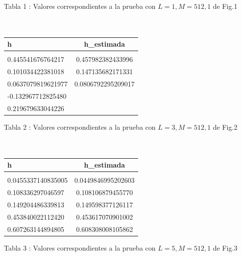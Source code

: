 \documentclass[10pt,journal,compsoc]{IEEEtran}
\begin{document}
Tabla 1 : Valores correspondientes a la prueba con $L=1 , M=512, 1$ de Fig.1 \\ \\ \\

\begin{tabular}{l c}
\hline\hline
h &  h\_estimada\\
\hline \\

0.445541676764217 & 0.457982382433996\\
0.101034422381018 & 0.147135682171331\\
0.0637079819621977 & 0.0806792295209017\\
-0.132967712825480 \\
0.219679633044226\\



\hline\hline

\end{tabular}
 
Tabla 2 : Valores correspondientes a la prueba con $L=3 , M=512, 1$ de Fig.2 \\ \\ \\

\begin{tabular}{l c}
\hline\hline
h &  h\_estimada\\
\hline \\

0.0455337140835005 & 0.0449846995202603\\
0.108336297046597 & 0.108106879455770\\
0.149204486339813 & 0.149598377126117\\
0.453840022112420 & 0.453617070901002\\
0.607263144894805 & 0.608308008105862\\




\hline\hline

\end{tabular}
 
Tabla 3 : Valores correspondientes a la prueba con $L=5 , M=512, 1$ de Fig.3
\end{document}
